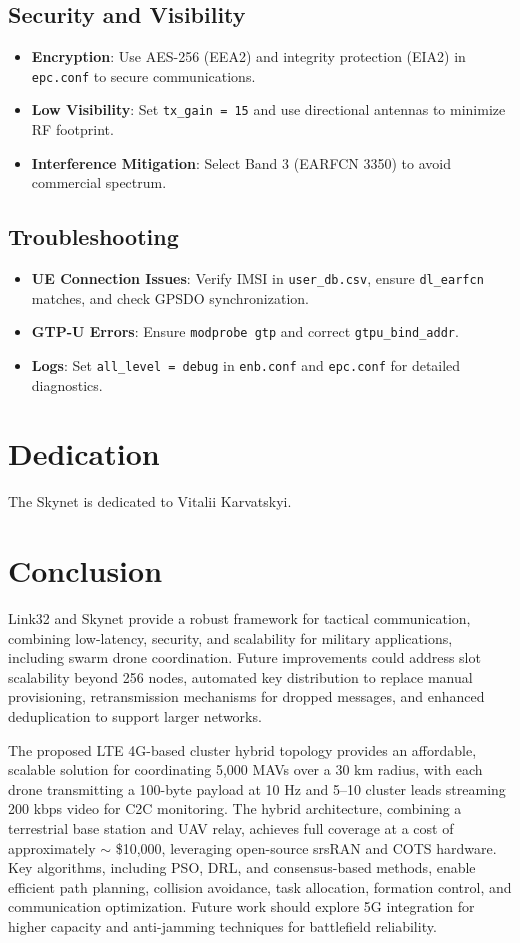 \documentclass{article}
\begin{document}
\subsection{Security and Visibility}
\begin{itemize}
\item \textbf{Encryption}: Use AES-256 (EEA2) and integrity protection (EIA2) in \texttt{epc.conf} to secure communications.
\item \textbf{Low Visibility}: Set \texttt{tx\_gain = 15} and use directional antennas to minimize RF footprint.
\item \textbf{Interference Mitigation}: Select Band 3 (EARFCN 3350) to avoid commercial spectrum.
\end{itemize}

\subsection{Troubleshooting}
\begin{itemize}
\item \textbf{UE Connection Issues}: Verify IMSI in \texttt{user\_db.csv}, ensure \texttt{dl\_earfcn} matches, and check GPSDO synchronization.
\item \textbf{GTP-U Errors}: Ensure \texttt{modprobe gtp} and correct \texttt{gtpu\_bind\_addr}.
\item \textbf{Logs}: Set \texttt{all\_level = debug} in \texttt{enb.conf} and \texttt{epc.conf} for detailed diagnostics.
\end{itemize}

\section{Dedication}
The Skynet is dedicated to Vitalii Karvatskyi.

\section{Conclusion}
Link32 and Skynet provide a robust framework for tactical communication, combining low-latency,
security, and scalability for military applications, including swarm drone coordination. Future
improvements could address slot scalability beyond 256 nodes, automated key distribution to replace
manual provisioning, retransmission mechanisms for dropped messages, and enhanced deduplication to
support larger networks.

The proposed LTE 4G-based cluster hybrid topology provides an affordable,
scalable solution for coordinating 5,000 MAVs over a 30 km radius,
with each drone transmitting a 100-byte payload at 10 Hz and 5--10 cluster
leads streaming 200 kbps video for C2C monitoring. The hybrid architecture,
combining a terrestrial base station and UAV relay, achieves full coverage
at a cost of approximately $\sim$ \$10,000, leveraging open-source srsRAN and COTS
hardware. Key algorithms, including PSO, DRL, and consensus-based methods,
enable efficient path planning, collision avoidance, task allocation,
formation control, and communication optimization. Future work should
explore 5G integration for higher capacity and anti-jamming techniques
for battlefield reliability.
\end{document}
